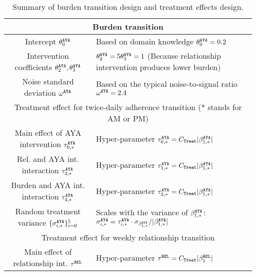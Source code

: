 \begin{table}[hpt]
    \centering
    \caption{Summary of burden transition design and treatment effects design.}
    \begin{tabular}{c|>{\centering\arraybackslash}p{}} 
    \hline
    \multicolumn{2}{c}{Burden transition}\\
    \hline
    \hline
    Intercept $\theta_{0}^{\tiny\texttt{AYA}}$  & Based on domain knowledge $\theta_{0}^{\tiny\texttt{AYA}} = 0.2$ \\
    Intervention coefficients $\theta_2^{\tiny\texttt{AYA}}, \theta_3^{\tiny\texttt{AYA}}$ & $\theta_2^{\tiny\texttt{AYA}} = 5\theta^{\tiny\texttt{AYA}}_{3} = 1$ (Because relationship intervention produces lower burden) \\
    Noise standard deviation $\omega^{\tiny\texttt{AYA}}$ & Based on the typical noise-to-signal ratio $\omega^{\tiny\texttt{AYA}} = 2.4$ \\
    \hline
    \multicolumn{2}{c}{Treatment effect for twice-daily adherence transition (* stands for AM or PM)}\\
    \hline
    \hline
    Main effect of AYA intervention $\tau_{0, *}^{\tiny\texttt{AYA}}$ & Hyper-parameter $\tau_{0, *}^{\tiny\texttt{AYA}} = C_{\tiny{\texttt{Treat}}}|\beta_{1, *}^{\tiny\texttt{AYA}}| $ \\
    Rel. and AYA int. interaction $\tau_{2, *}^{\tiny\texttt{AYA}}$ & Hyper-parameter $\tau_{1, *}^{\tiny\texttt{AYA}} = C_{\tiny{\texttt{Treat}}}|\beta_{1, *}^{\tiny\texttt{AYA}}|$ \\
    Burden and AYA int. interaction $\tau_{4, *}^{\tiny\texttt{AYA}}$ & Hyper-parameter $\tau_{2, *}^{\tiny\texttt{AYA}} = C_{\tiny{\texttt{Treat}}}|\beta_{1, *}^{\tiny\texttt{AYA}}|$ \\
    Random treatment variance $\{\sigma_{i, *}^{\tiny\texttt{AYA}}\}_{i = 0}^5$ & Scales with the variance of $\beta_{1, *}^{\tiny\texttt{AYA}}$: $\sigma_{i, *}^{\tiny\texttt{AYA}} = \tau_{i, *}^{\tiny\texttt{AYA}} \cdot  \sigma_{\beta_{1, *}^{\tiny\texttt{AYA}}} / |\beta_{1, *}^{\tiny\texttt{AYA}}|$ \\
    \hline
    \multicolumn{2}{c}{Treatment effect for weekly relationship transition}\\
    \hline
    \hline
    Main effect of relationship int. $\tau^{\tiny\texttt{REL}}$ & Hyper-parameter $\tau^{\tiny\texttt{REL}} = C_{\tiny{\texttt{Treat}}}|\beta_1^{\tiny\texttt{REL}}|$  \\
    \hline
    \end{tabular}
    \label{tab:imputation}
\end{table}


